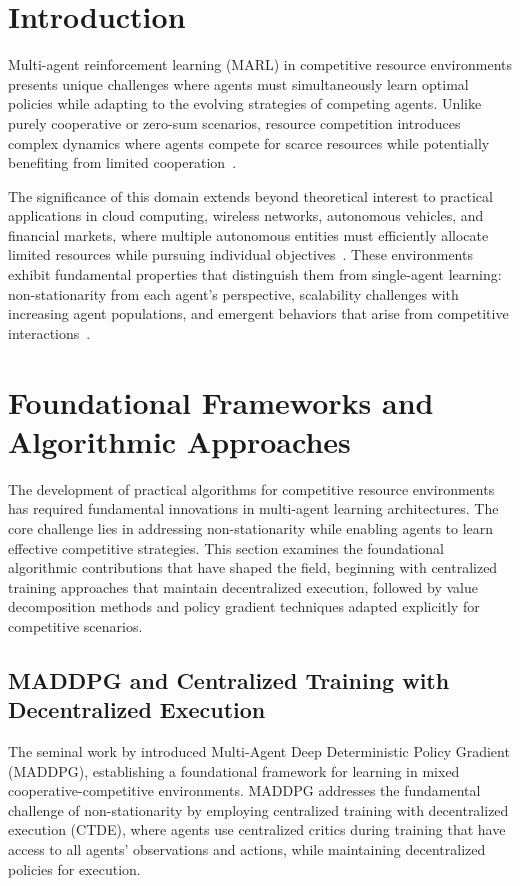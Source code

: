 \section{Introduction}

Multi-agent reinforcement learning (MARL) in competitive resource environments presents unique challenges where agents must simultaneously learn optimal policies while adapting to the evolving strategies of competing agents. Unlike purely cooperative or zero-sum scenarios, resource competition introduces complex dynamics where agents compete for scarce resources while potentially benefiting from limited cooperation~\autocite{lowe_multi-agent_2017}. 

The significance of this domain extends beyond theoretical interest to practical applications in cloud computing, wireless networks, autonomous vehicles, and financial markets, where multiple autonomous entities must efficiently allocate limited resources while pursuing individual objectives~\autocite{wang_qplex_2021, allahham_multi-agent_2022}. These environments exhibit fundamental properties that distinguish them from single-agent learning: non-stationarity from each agent's perspective, scalability challenges with increasing agent populations, and emergent behaviors that arise from competitive interactions~\autocite{hernandez-leal_survey_2019, ning_survey_2024}.

\section{Foundational Frameworks and Algorithmic Approaches}

The development of practical algorithms for competitive resource environments has required fundamental innovations in multi-agent learning architectures. The core challenge lies in addressing non-stationarity while enabling agents to learn effective competitive strategies. This section examines the foundational algorithmic contributions that have shaped the field, beginning with centralized training approaches that maintain decentralized execution, followed by value decomposition methods and policy gradient techniques adapted explicitly for competitive scenarios.

\subsection{MADDPG and Centralized Training with Decentralized Execution}

The seminal work by \textcite{lowe_multi-agent_2017} introduced Multi-Agent Deep Deterministic Policy Gradient (MADDPG), establishing a foundational framework for learning in mixed cooperative-competitive environments. MADDPG addresses the fundamental challenge of non-stationarity by employing centralized training with decentralized execution (CTDE), where agents use centralized critics during training that have access to all agents' observations and actions, while maintaining decentralized policies for execution.

